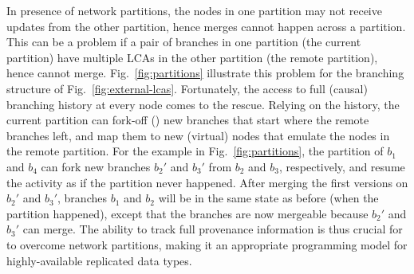 In presence of network partitions, the nodes in one partition may not
receive updates from the other partition, hence merges cannot happen
across a partition. This can be a problem if a pair of branches in one
partition (the current partition) have multiple LCAs in the other
partition (the remote partition), hence cannot merge.
Fig.~\ref{fig:partitions} illustrate this problem for the branching
structure of Fig.~\ref{fig:external-lcas}. Fortunately, the access to
full (causal) branching history at every node comes to the rescue.
Relying on the history, the current partition can fork-off ()
new branches that start where the remote branches left, and map them
to new (virtual) nodes that emulate the nodes in the remote partition.
For the example in Fig.~\ref{fig:partitions}, the partition of $b_1$
and $b_4$ can fork new branches $b_2'$ and $b_3'$ from $b_2$ and
$b_3$, respectively, and resume the activity as if the partition never
happened. After merging the first versions on $b_2'$ and $b_3'$,
branches $b_1$ and $b_2$ will be in the same state as before (when the
partition happened), except that the branches are now mergeable
because $b_2'$ and $b_3'$ can merge. The ability to track full
provenance information is thus crucial for \name to overcome network
partitions, making it an appropriate programming model for
highly-available replicated data types.

